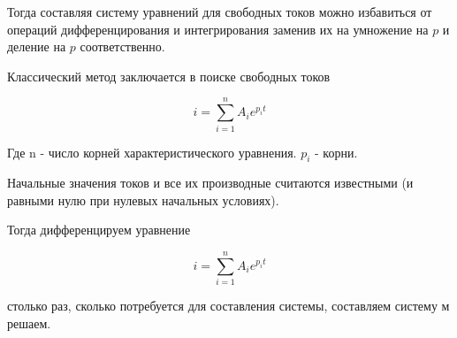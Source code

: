 Тогда составляя систему уравнений для свободных токов можно избавиться от операций дифференцирования и интегрирования заменив их на умножение на $p$ и деление на $p$ соответственно.

Классический метод заключается в поиске свободных токов

\begin{equation}
i = \sum_{i=1}^n A_i e^{p_i t}
\end{equation}

Где n - число корней характеристического уравнения. $p_i $ - корни.

Начальные значения токов и все их производные считаются известными (и равными нулю при нулевых начальных условиях).

Тогда дифференцируем уравнение 

\begin{equation}
i = \sum_{i=1}^n A_i e^{p_i t}
\end{equation}

столько раз, сколько потребуется для составления системы, составляем систему м решаем.



\pagebreak
